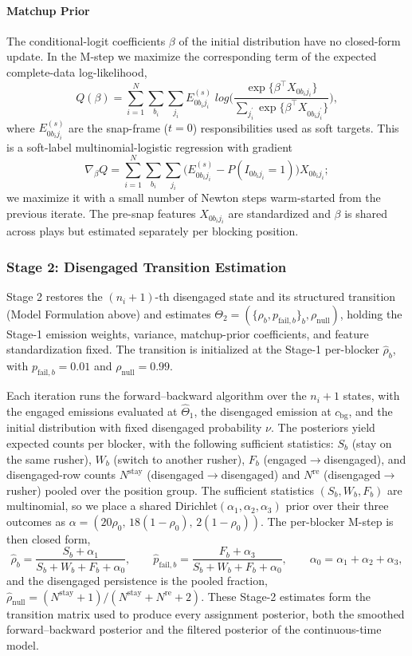 \documentclass[USenglish]{article}
\theoremstyle{dgthm}
\theoremstyle{dgdef}
\begin{document}
\begin{appendices}
\paragraph{Matchup Prior}
The conditional-logit coefficients $\beta$ of the initial distribution have no closed-form update. In the M-step we maximize the corresponding term of the expected complete-data log-likelihood,
$$ Q(\beta) = \sum_{i=1}^{N} \sum_{b_i} \sum_{j_i} E_{0 b_i j_i}^{(s)} \; log\Big( \frac{\exp\{\beta^\top X_{0 b_i j_i}\}}{\sum_{j_i^{'}} \exp\{\beta^\top X_{0 b_i j_i^{'}}\}} \Big), $$
where $E_{0 b_i j_i}^{(s)}$ are the snap-frame ($t=0$) responsibilities used as soft targets. This is a soft-label multinomial-logistic regression with gradient
$$ \nabla_\beta Q = \sum_{i=1}^{N} \sum_{b_i} \sum_{j_i} \big( E_{0 b_i j_i}^{(s)} - P(I_{0 b_i j_i} = 1) \big) X_{0 b_i j_i}; $$
we maximize it with a small number of Newton steps warm-started from the previous iterate. The pre-snap features $X_{0 b_i j_i}$ are standardized and $\beta$ is shared across plays but estimated separately per blocking position.

\subsubsection{Stage 2: Disengaged Transition Estimation}
Stage 2 restores the $(n_i+1)$-th disengaged state and its structured transition (Model Formulation above) and estimates $\Theta_2 = (\{\rho_b, p_{\text{fail},b}\}_b, \rho_{\text{null}})$, holding the Stage-1 emission weights, variance, matchup-prior coefficients, and feature standardization fixed. The transition is initialized at the Stage-1 per-blocker $\hat\rho_b$, with $p_{\text{fail},b} = 0.01$ and $\rho_{\text{null}} = 0.99$.

Each iteration runs the forward--backward algorithm over the $n_i + 1$ states, with the engaged emissions evaluated at $\hat\Theta_1$, the disengaged emission at $c_{\text{bg}}$, and the initial distribution with fixed disengaged probability $\nu$. The posteriors yield expected counts per blocker, with the following sufficient statistics: $S_b$ (stay on the same rusher), $W_b$ (switch to another rusher), $F_b$ (engaged$\to$disengaged), and disengaged-row counts $N^{\text{stay}}$ (disengaged$\to$disengaged) and $N^{\text{re}}$ (disengaged$\to$rusher) pooled over the position group. The sufficient statistics $(S_b, W_b, F_b)$ are multinomial, so we place a shared Dirichlet$(\alpha_1, \alpha_2, \alpha_3)$ prior over their three outcomes  as $\alpha = (20\rho_0,\, 18(1-\rho_0),\, 2(1-\rho_0))$. The per-blocker M-step is then closed form,
$$ \hat{\rho}_b = \frac{S_b + \alpha_1}{S_b + W_b + F_b + \alpha_0}, \qquad \hat{p}_{\text{fail},b} = \frac{F_b + \alpha_3}{S_b + W_b + F_b + \alpha_0}, \qquad \alpha_0 = \alpha_1 + \alpha_2 + \alpha_3, $$
and the disengaged persistence is the pooled fraction, $\hat{\rho}_{\text{null}} = (N^{\text{stay}} + 1) / (N^{\text{stay}} + N^{\text{re}} + 2)$. These Stage-2 estimates form the transition matrix used to produce every assignment posterior, both the smoothed forward--backward posterior and the filtered posterior of the continuous-time model.




\end{appendices}
\end{document}
